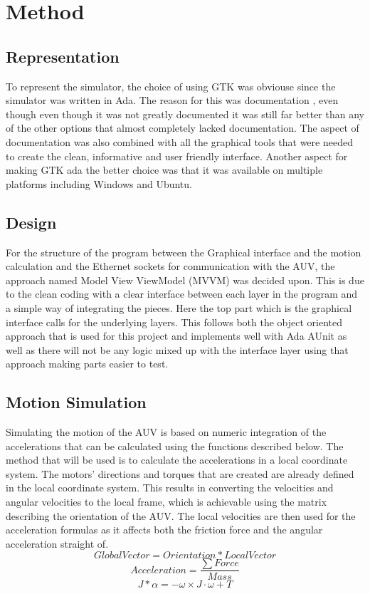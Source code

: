 \section{Method}\label{sec:method}

\subsection{Representation}

To represent the simulator, the choice of using GTK was obviouse since the simulator was written in Ada. The reason for this was documentation , even though even though it was not greatly documented it was still far better than any of the other options that almost completely lacked documentation. The aspect of documentation was also combined with all the graphical tools that were needed to create the clean, informative and user friendly interface. Another aspect for making GTK ada the better choice was that it was available on multiple platforms including Windows and Ubuntu.
\subsection{Design}

For the structure of the program between the Graphical interface and the motion calculation and the Ethernet sockets for communication with the AUV, the approach named Model View ViewModel (MVVM) was decided upon. This is due to the clean coding with a clear interface between each layer in the program and a simple way of integrating the pieces. Here the top part which is the graphical interface calls for the underlying layers. This follows both the object oriented approach that is used for this project and implements well with Ada AUnit as well as there will not be any logic mixed up with the interface layer using that approach making parts easier to test.
\subsection{Motion Simulation}

Simulating the motion of the AUV is based on numeric integration of the accelerations that can be calculated using the functions described below. The method that will be used is to calculate the accelerations in a local coordinate system. The motors' directions and torques that are created are already defined in the local coordinate system. This results in converting the velocities and angular velocities to the local frame, which is achievable using the matrix describing the orientation of the AUV. The local velocities are then used for the acceleration formulas as it affects both the friction force and the angular acceleration straight of.
\begin{equation}
Global Vector = Orientation*Local Vector
\end{equation}
\begin{equation}
Acceleration = \frac{\sum Force}{Mass}
\end{equation}
\begin{equation}
J*\alpha = - \omega \times J \cdot\omega + T 
\end{equation}

